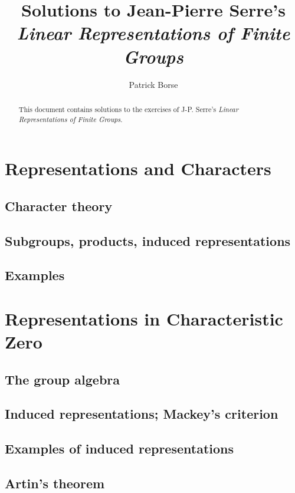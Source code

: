 \documentclass[oneside]{amsbook}
\title{Solutions to Jean-Pierre Serre's\\ \emph{Linear Representations of Finite Groups}}
\author{Patrick Borse}
\begin{document}
\begin{abstract}
This document contains solutions to the exercises of J-P. Serre's \emph{Linear Representations of Finite Groups}.
\end{abstract}

\maketitle

\tableofcontents

\part{Representations and Characters}
\setcounter{chapter}{1}
\chapter{Character theory}


\chapter{Subgroups, products, induced representations}


\setcounter{chapter}{4}
\chapter{Examples}


\part{Representations in Characteristic Zero}
\chapter{The group algebra}


\chapter{Induced representations; Mackey's criterion}


\chapter{Examples of induced representations}


\chapter{Artin's theorem}

\end{document}
